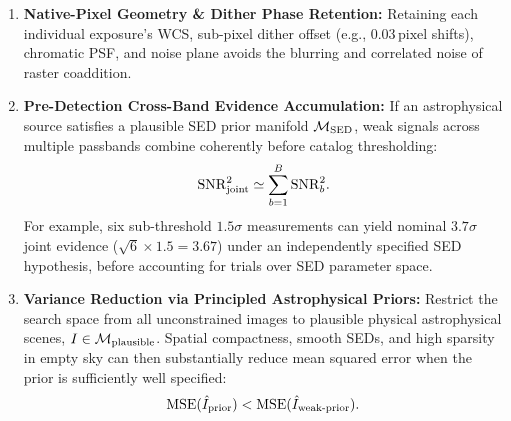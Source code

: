 \documentclass[11pt,a4paper]{article}
\begin{document}
\begin{enumerate}
    \item \textbf{Native-Pixel Geometry \& Dither Phase Retention:} Retaining each individual exposure's WCS, sub-pixel dither offset (e.g., $0.03\,\mathrm{pixel}$ shifts), chromatic PSF, and noise plane avoids the blurring and correlated noise of raster coaddition.
    \item \textbf{Pre-Detection Cross-Band Evidence Accumulation:} If an astrophysical source satisfies a plausible SED prior manifold $\mathcal{M}_{\rm SED}$, weak signals across multiple passbands combine coherently before catalog thresholding:
    \begin{equation}
    \mathrm{SNR}_{\rm joint}^2 \simeq \sum_{b=1}^B \mathrm{SNR}_b^2.
    \end{equation}
    For example, six sub-threshold $1.5\sigma$ measurements can yield nominal $3.7\sigma$ joint evidence ($\sqrt{6}\times 1.5 = 3.67$) under an independently specified SED hypothesis, before accounting for trials over SED parameter space.
    \item \textbf{Variance Reduction via Principled Astrophysical Priors:}
    Restrict the search space from all unconstrained images to plausible
    physical astrophysical scenes,
    $I \in \mathcal{M}_{\rm plausible}$.  Spatial compactness, smooth SEDs,
    and high sparsity in empty sky can then substantially reduce mean squared
    error when the prior is sufficiently well specified:
    \begin{equation}
    \mathrm{MSE}(\hat{I}_{\rm prior}) < \mathrm{MSE}(\hat{I}_{\rm weak\text{-}prior}).
    \end{equation}
\end{enumerate}
\end{document}
